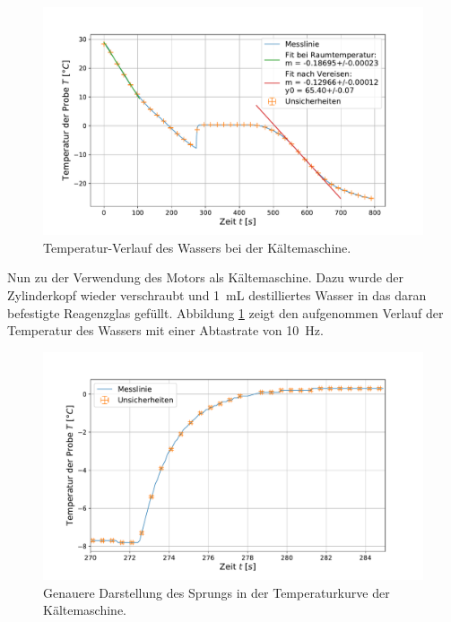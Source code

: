 	\begin{figure}[ht]
		\centering
		\includegraphics[width=\textwidth]{data/kalt_machen.pdf}
		\caption{Temperatur-Verlauf des Wassers bei der Kältemaschine.}
		\label{fig:Kältemaschine}	
	\end{figure}
	Nun zu der Verwendung des Motors als Kältemaschine.
	Dazu wurde der Zylinderkopf wieder verschraubt und \SI{1}{\milli\liter} destilliertes Wasser in das daran befestigte Reagenzglas gefüllt.
	Abbildung \ref{fig:Kältemaschine} zeigt den aufgenommen Verlauf der Temperatur des Wassers mit einer Abtastrate von \SI{10}{\hertz}.
	\begin{figure}[ht]
		\centering
		\includegraphics[width=\textwidth]{data/kalt_sprung.pdf}
		\caption{Genauere Darstellung des Sprungs in der Temperaturkurve der Kältemaschine.}
		\label{fig:KaltSprung}	
	\end{figure}

